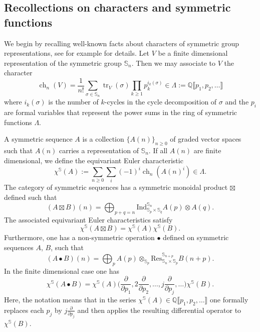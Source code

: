 \documentclass[12pt]{amsart}
\theoremstyle{definition}
\numberwithin{equation}{section}
\renewcommand{\ss}{\mathbb{S}}
\DeclareMathOperator{\ch}{ch}
\DeclareMathOperator{\tr}{tr}
\newcommand{\Q}{\mathbb{Q}}
\theoremstyle{definition} %
\theoremstyle{remark}
\begin{document}
\subsection{Recollections on characters and symmetric functions}
We begin by recalling well-known facts about characters of symmetric group representations, see for example \cite[Section 7]{GetzlerKapranov} for details.
Let $V$ be a finite dimensional representation of the symmetric group $\ss_n$. Then we may associate to $V$ the character 
\[
\ch_n(V) = \frac1{n!} \sum_{\sigma\in \ss_n} \tr_V(\sigma) 
 \prod_{k\geq 1} p_k^{i_k(\sigma)}
\in \Lambda := \Q\llbracket p_1,p_2,\dots \rrbracket
\]
where $i_k(\sigma)$ is the number of $k$-cycles in the cycle decomposition of $\sigma$ and the $p_i$ are formal variables that represent the power sums in the ring of symmetric functions $\Lambda$.

A symmetric sequence $A$ is a collection $\{A(n)\}_{n\geq 0}$ of graded vector spaces such that $A(n)$ carries a representation of $\ss_n$.
If all $A(n)$ are finite dimensional, we define the equivariant Euler characteristic 
\[
\chi^\ss(A) := \sum_{n\geq 0} \sum_i (-1)^i \ch_n(A(n)^i) \in \Lambda.
\]
The category of symmetric sequences has a symmetric monoidal product $\boxtimes$ defined such that 
\begin{equation*}
(A\boxtimes B)(n) = \bigoplus_{p+q=n} \mathrm{Ind}_{\ss_p\times \ss_q}^{\ss_n}
A(p)\otimes A(q).
\end{equation*}
The associated equivariant Euler characteristics satisfy 
\begin{equation}\label{equ:chi box}
\chi^\ss (A\boxtimes B) = \chi^\ss(A) \chi^\ss(B).
\end{equation}
Furthermore, one has a non-symmetric operation $\bullet$ defined on symmetric sequences $A$, $B$, such that
\[
(A\bullet B)(n) = \bigoplus_{p} A(p) \otimes_{\ss_p} \mathrm{Res}^{\ss_{n+p}}_{\ss_n\times \ss_p}B(n+p).  
\]
In the finite dimensional case one has
\begin{equation}\label{equ:chi bullet}
\chi^{\ss}(A\bullet B) = \chi^{\ss}(A)\Big(\frac{\partial}{\partial p_1}, 2 \frac{\partial}{\partial p_2 }, \dots, j \frac{\partial}{\partial p_j },\dots\Big) \chi^\ss(B). 
\end{equation}
Here, the notation means that in the series $\chi^{\ss}(A)\in \Q\llbracket p_1,p_2,\dots\rrbracket$ one formally replaces each $p_j$ by $j \frac{\partial}{\partial p_j } $ and then applies the resulting differential operator to $\chi^\ss(B)$.
\end{document}
